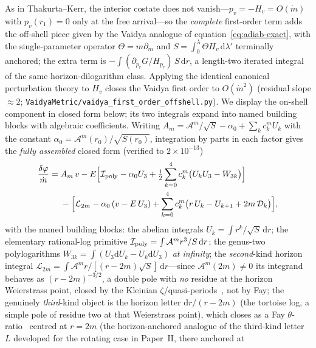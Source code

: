 \documentclass[12pt]{iopart}
\newcommand{\dd}{\mathrm{d}}
\begin{document}
As in Thakurta--Kerr, the interior costate does not
vanish---$p_v=-H_v=O(\dot m)$ with $p_v(r_1)=0$ only at the free arrival---so the
\emph{complete} first-order term adds the off-shell piece given by the Vaidya analogue
of equation~\eqref{eq:adiab-exact}, with the single-parameter operator $\Theta=m\partial_m$
and $S=\int_0^\lambda\Theta H_v\,\dd\lambda'$ terminally anchored; the extra term is
$-\!\int(\partial_{p_r}G/H_{p_r})\,S\,\dd r$, a length-two iterated integral of the
same horizon-dilogarithm class. Applying the identical canonical perturbation theory
to $H_v$ closes the Vaidya first order to $O(\dot m^2)$ (residual slope $\approx2$;
\texttt{VaidyaMetric/vaidya\_first\_order\_offshell.py}). We display the on-shell
component in closed form below;
its two integrals expand into named building blocks with algebraic coefficients.
Writing $A_m=\mathcal{A}^m/\sqrt S-\alpha_0+\sum_k c_k^m U_k$ with the constant
$\alpha_0=\mathcal{A}^m(r_0)/\sqrt{S(r_0)}$, integration by parts in each factor gives
the \emph{fully assembled} closed form (verified to $2\times10^{-13}$)
\begin{equation}
\begin{aligned}
    \frac{\delta\varphi}{\dot m}
    ={}&A_m\,v
    -E\Big[\mathcal{I}_{\rm poly}-\alpha_0 U_3
        +\tfrac12\sum_{k=0}^4 c_k^m\big(U_kU_3-W_{3k}\big)\Big]\\
    &{}-\Big[\mathcal{L}_{2m}-\alpha_0\,(v-E\,U_3)
        +\sum_{k=0}^4 c_k^m\big(r\,U_k-U_{k+1}+2m\,\mathcal{D}_k\big)\Big],
\end{aligned}
    \label{eq:vaidya-full}
\end{equation}
with the named building blocks: the abelian integrals $U_k=\int r^k/\sqrt S\,\dd r$;
the elementary rational-log primitive
$\mathcal{I}_{\rm poly}=\int\mathcal{A}^m r^3/S\,\dd r$; the genus-two
polylogarithms $W_{3k}=\int(U_3\dd U_k-U_k\dd U_3)$ \emph{at infinity};
the \emph{second}-kind horizon integral
$\mathcal{L}_{2m}=\int\mathcal{A}^m r/[(r-2m)\sqrt S]\,\dd r$---since
$\mathcal{A}^m(2m)\ne0$ its integrand behaves as $(r-2m)^{-3/2}$, a double pole with
\emph{no} residue at the horizon Weierstrass point, closed by the Kleinian
$\zeta$/quasi-periods~\cite{BuchstaberEnolskii1997,BakerAbelian1897}, not by Fay; the
genuinely \emph{third}-kind object is the horizon letter $\dd r/(r-2m)$ (the tortoise
log, a simple pole of residue two at that Weierstrass point), which closes as a Fay
$\theta$-ratio~\cite{Fay1973} centred at $r=2m$ (the horizon-anchored analogue of the
third-kind letter $L$ developed for the rotating case in Paper~II, there anchored at
\end{document}
